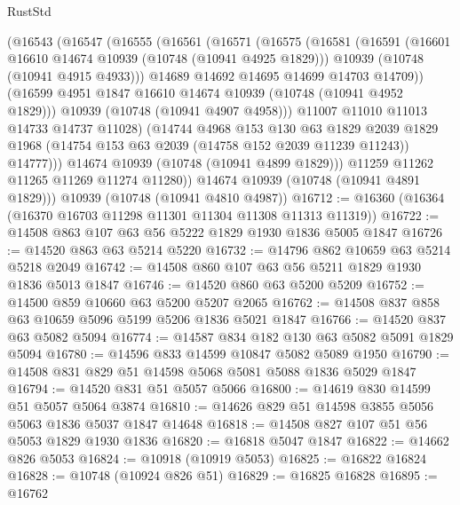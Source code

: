 \begin{lexlean}{RustStd}
\begin{coremodule}
          (@16543
            (@16547
              (@16555
                (@16561
                  (@16571
                    (@16575
                      (@16581
                        (@16591
                          (@16601 @16610 @14674 @10939 (@10748 (@10941 @4925 @1829)))
                          @10939
                          (@10748 (@10941 @4915 @4933)))
                        @14689
                        @14692
                        @14695
                        @14699
                        @14703
                        @14709))
                    (@16599 @4951 @1847 @16610 @14674 @10939 (@10748 (@10941 @4952 @1829)))
                    @10939
                    (@10748 (@10941 @4907 @4958)))
                  @11007
                  @11010
                  @11013
                  @14733
                  @14737
                  @11028)
                (@14744
                  @4968
                  @153
                  @130
                  @63
                  @1829
                  @2039
                  @1829
                  @1968
                  (@14754 @153 @63 @2039 (@14758 @152 @2039 @11239 @11243))
                  @14777)))
            @14674
            @10939
            (@10748 (@10941 @4899 @1829)))
          @11259
          @11262
          @11265
          @11269
          @11274
          @11280))
      @14674
      @10939
      (@10748 (@10941 @4891 @1829)))
    @10939
    (@10748 (@10941 @4810 @4987))
@16712 := @16360 (@16364 (@16370 @16703 @11298 @11301 @11304 @11308 @11313 @11319))
@16722 := @14508 @863 @107 @63 @56 @5222 @1829 @1930 @1836 @5005 @1847
@16726 := @14520 @863 @63 @5214 @5220
@16732 := @14796 @862 @10659 @63 @5214 @5218 @2049
@16742 := @14508 @860 @107 @63 @56 @5211 @1829 @1930 @1836 @5013 @1847
@16746 := @14520 @860 @63 @5200 @5209
@16752 := @14500 @859 @10660 @63 @5200 @5207 @2065
@16762 := @14508 @837 @858 @63 @10659 @5096 @5199 @5206 @1836 @5021 @1847
@16766 := @14520 @837 @63 @5082 @5094
@16774 := @14587 @834 @182 @130 @63 @5082 @5091 @1829 @5094
@16780 := @14596 @833 @14599 @10847 @5082 @5089 @1950
@16790 := @14508 @831 @829 @51 @14598 @5068 @5081 @5088 @1836 @5029 @1847
@16794 := @14520 @831 @51 @5057 @5066
@16800 := @14619 @830 @14599 @51 @5057 @5064 @3874
@16810 := @14626 @829 @51 @14598 @3855 @5056 @5063 @1836 @5037 @1847 @14648
@16818 := @14508 @827 @107 @51 @56 @5053 @1829 @1930 @1836
@16820 := @16818 @5047 @1847
@16822 := @14662 @826 @5053
@16824 := @10918 (@10919 @5053)
@16825 := @16822 @16824
@16828 := @10748 (@10924 @826 @51)
@16829 := @16825 @16828
@16895 := @16762

\end{coremodule}
\end{lexlean}
